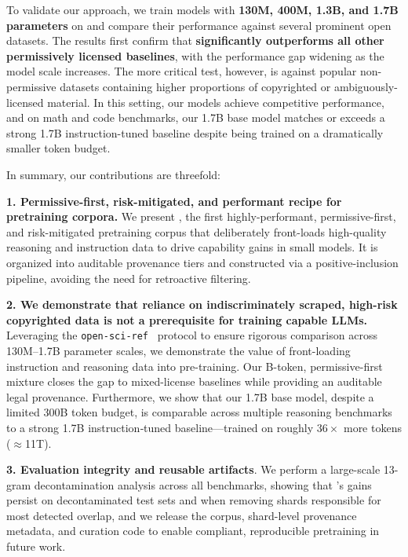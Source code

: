 To validate our approach, we train models with \textbf{130M, 400M, 1.3B, and 1.7B parameters} on \MixtureVitae{} and compare their performance against several prominent open datasets. The results first confirm that \MixtureVitae{} \textbf{significantly outperforms all other permissively licensed baselines}, with the performance gap widening as the model scale increases. The more critical test, however, is against popular non-permissive datasets containing higher proportions of copyrighted or ambiguously-licensed material. In this setting, our models achieve competitive performance, and on math and code benchmarks, our 1.7B base model matches or exceeds a strong 1.7B instruction-tuned baseline despite being trained on a dramatically smaller token budget. 

In summary, our contributions are threefold:

\textbf{1. Permissive-first, risk-mitigated, and performant recipe for pretraining corpora.} We present \MixtureVitae{}, the first highly-performant, permissive-first, and risk-mitigated pretraining corpus that deliberately front-loads high-quality reasoning and instruction data to drive capability gains in small models. It is organized into auditable provenance tiers and constructed via a positive-inclusion pipeline, avoiding the need for retroactive filtering.

\textbf{2. We demonstrate that reliance on indiscriminately scraped, high-risk copyrighted data is not a prerequisite for training capable LLMs.} Leveraging the \texttt{open-sci-ref}~\citep{nezhurina2025opensciref001openreproduciblereference} protocol to ensure rigorous comparison across 130M–1.7B parameter scales, we demonstrate the value of front-loading instruction and reasoning data into pre-training. Our \DatasetSize{}B-token, permissive-first mixture closes the gap to mixed-license baselines while providing an auditable legal provenance. Furthermore, we show that our 1.7B base model, despite a limited 300B token budget, is comparable across multiple reasoning benchmarks to a strong 1.7B instruction‑tuned baseline—trained on roughly $36\times$ more tokens ($\approx$11T).

\textbf{3. Evaluation integrity and reusable artifacts}. We perform a large-scale 13-gram decontamination analysis across all benchmarks, showing that \MixtureVitae{}’s gains persist on decontaminated test sets and when removing shards responsible for most detected overlap, and we release the corpus, shard-level provenance metadata, and curation code to enable compliant, reproducible pretraining in future work. 

